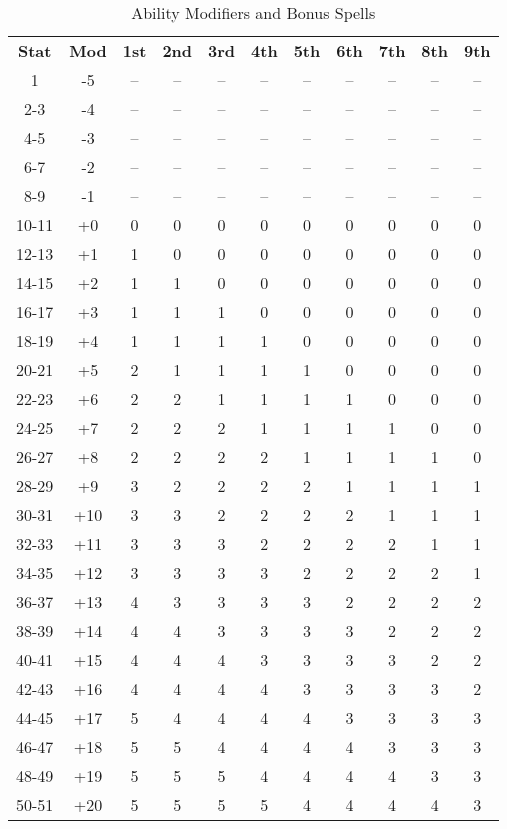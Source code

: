 \begin{table}[htb]
\caption{Ability Modifiers and Bonus Spells}
\centering
\begin{tabular}{*{11}{c}}
\textbf{Stat} & \textbf{Mod} & \textbf{1st} & \textbf{2nd} & \textbf{3rd} & \textbf{4th} & \textbf{5th} & \textbf{6th} & \textbf{7th} & \textbf{8th} & \textbf{9th}\\
1 & -5 & -- & -- & -- & -- & -- & -- & -- & -- & -- \\
2-3 & -4 & -- & -- & -- & -- & -- & -- & -- & -- & -- \\
4-5 & -3 & -- & -- & -- & -- & -- & -- & -- & -- & -- \\
6-7 & -2 & -- & -- & -- & -- & -- & -- & -- & -- & -- \\
8-9 & -1 & -- & -- & -- & -- & -- & -- & -- & -- & -- \\
10-11 & +0 & 0 & 0 & 0 & 0 & 0 & 0 & 0 & 0 & 0\\
12-13 & +1 & 1 & 0 & 0 & 0 & 0 & 0 & 0 & 0 & 0\\
14-15 & +2 & 1 & 1 & 0 & 0 & 0 & 0 & 0 & 0 & 0\\
16-17 & +3 & 1 & 1 & 1 & 0 & 0 & 0 & 0 & 0 & 0\\
18-19 & +4 & 1 & 1 & 1 & 1 & 0 & 0 & 0 & 0 & 0\\
20-21 & +5 & 2 & 1 & 1 & 1 & 1 & 0 & 0 & 0 & 0\\
22-23 & +6 & 2 & 2 & 1 & 1 & 1 & 1 & 0 & 0 & 0\\
24-25 & +7 & 2 & 2 & 2 & 1 & 1 & 1 & 1 & 0 & 0\\
26-27 & +8 & 2 & 2 & 2 & 2 & 1 & 1 & 1 & 1 & 0\\
28-29 & +9 & 3 & 2 & 2 & 2 & 2 & 1 & 1 & 1 & 1\\
30-31 & +10 & 3 & 3 & 2 & 2 & 2 & 2 & 1 & 1 & 1\\
32-33 & +11 & 3 & 3 & 3 & 2 & 2 & 2 & 2 & 1 & 1\\
34-35 & +12 & 3 & 3 & 3 & 3 & 2 & 2 & 2 & 2 & 1\\
36-37 & +13 & 4 & 3 & 3 & 3 & 3 & 2 & 2 & 2 & 2\\
38-39 & +14 & 4 & 4 & 3 & 3 & 3 & 3 & 2 & 2 & 2\\
40-41 & +15 & 4 & 4 & 4 & 3 & 3 & 3 & 3 & 2 & 2\\
42-43 & +16 & 4 & 4 & 4 & 4 & 3 & 3 & 3 & 3 & 2\\
44-45 & +17 & 5 & 4 & 4 & 4 & 4 & 3 & 3 & 3 & 3\\
46-47 & +18 & 5 & 5 & 4 & 4 & 4 & 4 & 3 & 3 & 3\\
48-49 & +19 & 5 & 5 & 5 & 4 & 4 & 4 & 4 & 3 & 3\\
50-51 & +20 & 5 & 5 & 5 & 5 & 4 & 4 & 4 & 4 & 3\\
\end{tabular}
\end{table}

